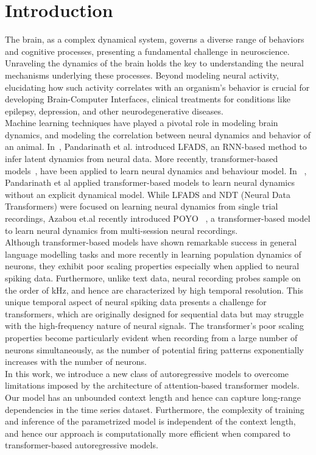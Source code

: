 \chapter{Introduction}
The brain, as a complex dynamical system, governs a diverse range of behaviors and cognitive processes, presenting a fundamental challenge in neuroscience. Unraveling the dynamics of the brain holds the key to understanding the neural mechanisms underlying these processes. Beyond modeling neural activity, elucidating how such activity correlates with an organism's behavior is crucial for developing Brain-Computer Interfaces, clinical treatments for conditions like epilepsy, depression, and other neurodegenerative diseases. \\


Machine learning techniques have played a pivotal role in modeling brain dynamics, and modeling the correlation between neural dynamics and behavior of an animal. In~\cite{pandarinath2018inferring}, Pandarinath et al. introduced LFADS, an RNN-based method to infer latent dynamics from neural data.  More recently, transformer-based models~\cite{vaswani2017attention, geneva2022transformers}, have been applied to learn neural dynamics and behaviour model. In ~\cite{ye2021representation}, Pandarinath et al applied transformer-based models to learn neural dynamics without an explicit dynamical model. While LFADS and NDT (Neural Data Transformers) were focused on learning neural dynamics from single trial recordings, Azabou et.al recently introduced POYO ~\cite{azabou2023unified}, a transformer-based model to learn neural dynamics from multi-session neural recordings.
\\

Although transformer-based models have shown remarkable success in general language modelling tasks and more recently in learning population dynamics of neurons, they exhibit poor scaling properties especially when applied to neural spiking data. Furthermore, unlike text data, neural recording probes sample on the order of kHz, and hence are characterized by high temporal resolution. This unique temporal aspect of neural spiking data presents a challenge for transformers, which are originally designed for sequential data but may struggle with the high-frequency nature of neural signals. The transformer's poor scaling properties become particularly evident when recording from a large number of neurons simultaneously, as the number of potential firing patterns exponentially increases with the number of neurons.
\\

In this work, we introduce a new class of autoregressive models to overcome limitations imposed by the architecture of attention-based transformer models. Our model has an unbounded context length and hence can capture long-range dependencies in the time series dataset. Furthermore, the complexity of training and inference of the parametrized model is independent of the context length, and hence our approach is computationally more efficient when compared to transformer-based autoregressive models.
